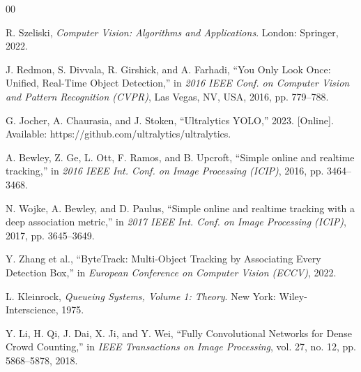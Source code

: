\documentclass[journal, twocolumn]{IEEEtran}
\begin{document}

\begin{thebibliography}{00}

 R. Szeliski, \textit{Computer Vision: Algorithms and Applications}. London: Springer, 2022.

 J. Redmon, S. Divvala, R. Girshick, and A. Farhadi, ``You Only Look Once: Unified, Real-Time Object Detection,'' in \textit{2016 IEEE Conf. on Computer Vision and Pattern Recognition (CVPR)}, Las Vegas, NV, USA, 2016, pp. 779--788.

 G. Jocher, A. Chaurasia, and J. Stoken, ``Ultralytics YOLO,'' 2023. [Online]. Available: https://github.com/ultralytics/ultralytics.

 A. Bewley, Z. Ge, L. Ott, F. Ramos, and B. Upcroft, ``Simple online and realtime tracking,'' in \textit{2016 IEEE Int. Conf. on Image Processing (ICIP)}, 2016, pp. 3464--3468.

 N. Wojke, A. Bewley, and D. Paulus, ``Simple online and realtime tracking with a deep association metric,'' in \textit{2017 IEEE Int. Conf. on Image Processing (ICIP)}, 2017, pp. 3645--3649.

 Y. Zhang et al., ``ByteTrack: Multi-Object Tracking by Associating Every Detection Box,'' in \textit{European Conference on Computer Vision (ECCV)}, 2022.

 L. Kleinrock, \textit{Queueing Systems, Volume 1: Theory}. New York: Wiley-Interscience, 1975.

 Y. Li, H. Qi, J. Dai, X. Ji, and Y. Wei, ``Fully Convolutional Networks for Dense Crowd Counting,'' in \textit{IEEE Transactions on Image Processing}, vol. 27, no. 12, pp. 5868--5878, 2018.

\end{thebibliography}
\end{document}
